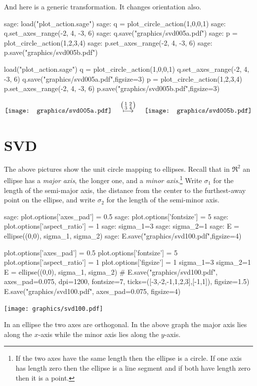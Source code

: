 And here is a generic transformation.
It changes orientation also.
\begin{sagecommandline}
sage: load("plot_action.sage")
sage: q = plot_circle_action(1,0,0,1) 
sage: q.set_axes_range(-2, 4, -3, 6) 
sage: q.save("graphics/svd005a.pdf")
sage: p = plot_circle_action(1,2,3,4) 
sage: p.set_axes_range(-2, 4, -3, 6) 
sage: p.save("graphics/svd005b.pdf")
\end{sagecommandline}
\begin{sagesilent}
load("plot_action.sage")
q = plot_circle_action(1,0,0,1) 
q.set_axes_range(-2, 4, -3, 6) 
q.save("graphics/svd005a.pdf",figsize=3)
p = plot_circle_action(1,2,3,4) 
p.set_axes_range(-2, 4, -3, 6) 
p.save("graphics/svd005b.pdf",figsize=3)
\end{sagesilent}
\begin{equation*}
  \vcenteredhbox{\texttt{[image: graphics/svd005a.pdf]}}
  \quad\mapsunder{\big (\begin{smallmatrix} 1 &2 \\ 3 &4 \end{smallmatrix}\big )}\quad
  \vcenteredhbox{\texttt{[image: graphics/svd005b.pdf]}}
\end{equation*}



\section{SVD}
The above pictures show the unit circle mapping to ellipses.
Recall that in $\Re^2$ an ellipse has a \textit{major axis}, 
the longer one, and a 
\textit{minor axis}.\footnote{If the two axes have the same length 
then the ellipse is a circle.
If one axis has length zero then the ellipse is a line segment 
and if both have length zero then it is a point.}
Write $\sigma_1$ for the length of the semi-major axis, 
the distance from the center to the furthest-away point on the ellipse,
and write $\sigma_2$ for the length of the semi-minor axis.
\begin{sagecommandline}
sage: plot.options['axes_pad'] = 0.5
sage: plot.options['fontsize'] = 5
sage: plot.options['aspect_ratio'] = 1
sage: sigma_1=3
sage: sigma_2=1
sage: E = ellipse((0,0), sigma_1, sigma_2)
sage: E.save("graphics/svd100.pdf",figsize=4)
\end{sagecommandline}
\begin{sagesilent}
plot.options['axes_pad'] = 0.5
plot.options['fontsize'] = 5
plot.options['aspect_ratio'] = 1
plot.options['figsize'] = 1
sigma_1=3
sigma_2=1
E = ellipse((0,0), sigma_1, sigma_2)
# E.save("graphics/svd100.pdf", axes_pad=0.075, dpi=1200, fontsize=7, ticks=([-3,-2,-1,1,2,3],[-1,1]), figsize=1.5)
E.save("graphics/svd100.pdf", axes_pad=0.075, figsize=4)
\end{sagesilent}
\begin{center}
  \texttt{[image: graphics/svd100.pdf]}
\end{center}
In an ellipse the two axes are orthogonal.
In the above graph the major axis lies along the $x$-axis while the
minor axis lies along the $y$-axis.

